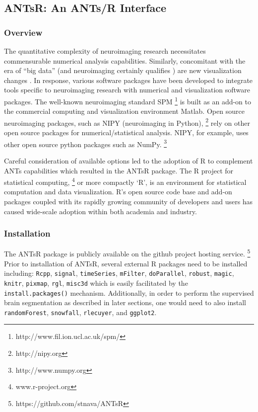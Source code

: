 \documentclass[final,5p,times,twocolumn]{elsarticle}
\begin{document}
\subsection{ANTsR:  An ANTs/R Interface}

\subsubsection{Overview}

The quantitative complexity of neuroimaging research necessitates 
commensurable numerical analysis capabilities.  Similarly, concomitant
with the era of ``big data'' (and neuroimaging certainly qualifies
\citep{vanhorn2013}) are new visualization changes 
\citep{childs2013,kehrer2013}.
In response, various software packages have been developed to
integrate tools specific to neuroimaging research with numerical
and visualization software packages.
The well-known neuroimaging standard SPM%
\footnote{
http://www.fil.ion.ucl.ac.uk/spm/
}
is built as an add-on to the commercial computing and visualization environment
Matlab.  Open source neuroimaging packages, such as NIPY (neuroimaging in Python),%
\footnote{
http://nipy.org
} 
rely on other open source packages for numerical/statistical analysis.  NIPY,
for example, uses other open source python packages such as NumPy.%
\footnote{
http://www.numpy.org
}  

Careful consideration of available options
led to the adoption of R to complement ANTs capabilities which resulted in the
ANTsR package.
The R project for statistical computing,%
\footnote{
www.r-project.org
}
 or more compactly
`R', is an environment for statistical computation
and data visualization.  R's open source code base
and add-on packages coupled with its rapidly growing 
community of developers and users has caused wide-scale
adoption within both academia and industry.


\subsubsection{Installation}

The ANTsR package is publicly available on the github project hosting service.%
\footnote{
https://github.com/stnava/ANTsR
}
Prior to installation of ANTsR, several external R packages
need to be installed including: \verb#Rcpp#, \verb#signal#, \verb#timeSeries#, 
\verb#mFilter#, \verb#doParallel#, \verb#robust#, \verb#magic#, \verb#knitr#, \verb#pixmap#, 
\verb#rgl#, \verb#misc3d# which is easily facilitated by the 
\verb#install.packages()# mechanism.  Additionally, in order
to perform the supervised brain segmentation as described 
in later sections, one would need to also install 
\verb#randomForest#, \verb#snowfall#, \verb#rlecuyer#,
and \verb#ggplot2#. 
\end{document}
